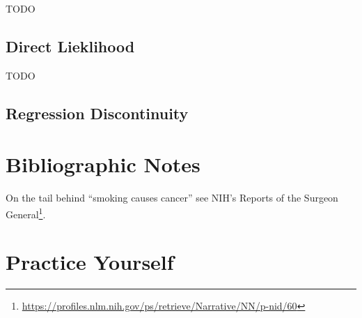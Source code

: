 \documentclass[]{book}
\renewcommand{\href}[2]{#2\footnote{\url{#1}}}
\theoremstyle{definition}
\theoremstyle{definition}
\theoremstyle{definition}
\theoremstyle{remark}
\begin{document}
TODO

\hypertarget{direct-lieklihood}{%
\subsection{Direct Lieklihood}\label{direct-lieklihood}}

TODO

\hypertarget{regression-discontinuity}{%
\subsection{Regression Discontinuity}\label{regression-discontinuity}}

\hypertarget{bibliographic-notes-19}{%
\section{Bibliographic Notes}\label{bibliographic-notes-19}}

On the tail behind ``smoking causes cancer'' see \href{https://profiles.nlm.nih.gov/ps/retrieve/Narrative/NN/p-nid/60}{NIH's Reports of the Surgeon General}.

\hypertarget{practice-yourself-18}{%
\section{Practice Yourself}\label{practice-yourself-18}}


\end{document}
